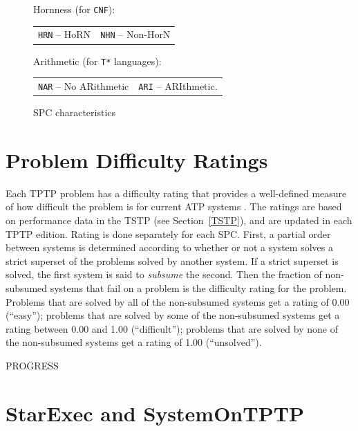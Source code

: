 \documentclass{easychair}
\newenvironment{packed_itemize}{
\vspace*{-0.2em}
\begin{itemize}
\setlength{\partopsep}{0pt}
\setlength{\itemsep}{1pt}
\setlength{\parskip}{0pt}
\setlength{\parsep}{0pt}
}{\end{itemize}}
\begin{document}
\begin{figure}[bht]
\begin{packed_itemize}
\item Hornness (for {\tt CNF}): \\
      \begin{tabular}{@{}p{5cm}l}
      {\tt HRN} -- HoRN &
      {\tt NHN} -- Non-HorN
      \end{tabular}
\item Arithmetic (for {\tt T*} languages): \\
      \begin{tabular}{@{}p{5cm}l}
      {\tt NAR} -- No ARithmetic &
      {\tt ARI} -- ARIthmetic.
      \end{tabular}
\end{packed_itemize}
\caption{SPC characteristics}
\label{SPCCharacteristics}
\end{figure} 

\section{Problem Difficulty Ratings}
\label{Ratings}

Each TPTP problem has a difficulty rating that provides a well-defined measure of how difficult 
the problem is for current ATP systems \cite{SS01}.
The ratings are based on performance data in the TSTP (see Section~\ref{TSTP}), and are updated
in each TPTP edition.
Rating is done separately for each SPC.
First, a partial order between systems is determined according to whether or not a system 
solves a strict superset of the problems solved by another system. 
If a strict superset is solved, the first system is said to {\em subsume} the second. 
Then the fraction of non-subsumed systems that fail on a problem is the difficulty rating 
for the problem. 
Problems that are solved by all of the non-subsumed systems get a rating of 0.00 (``easy'');
problems that are solved by some of the non-subsumed systems get a rating between 
0.00 and 1.00 (``difficult''); 
problems that are solved by none of the non-subsumed systems get a rating of 1.00 (``unsolved'').

PROGRESS

\section{StarExec and SystemOnTPTP}
\label{StarExec}
\end{document}

